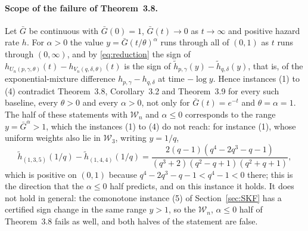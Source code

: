 \documentclass[10pt]{article}
\theoremstyle{plain}
\theoremstyle{definition}
\theoremstyle{remark}
\begin{document}
\paragraph{Scope of the failure of Theorem~3.8.} Let $\bar G$ be continuous with $\bar G(0)=1$, $\bar G(t)\to0$ as $t\to\infty$ and positive hazard rate $h$. For $\alpha>0$ the value $y=\bar G(t/\theta)^\alpha$ runs through all of $(0,1)$ as $t$ runs through $(0,\infty)$, and by \eqref{eq:reduction} the sign of $h_{U_n(p,\gamma,\theta)}(t)-h_{V_n(q,\delta,\theta)}(t)$ is the sign of $\tilde h_{p,\gamma}(y)-\tilde h_{q,\delta}(y)$, that is, of the exponential-mixture difference $h_{p,\gamma}-h_{q,\delta}$ at time $-\log y$. Hence instances (1) to (4) contradict Theorem~3.8, Corollary~3.2 and Theorem~3.9 for every such baseline, every $\theta>0$ and every $\alpha>0$, not only for $\bar G(t)=e^{-t}$ and $\theta=\alpha=1$. The half of these statements with $\mathcal W_n$ and $\alpha\le0$ corresponds to the range $y=\bar G^\alpha>1$, which the instances (1) to (4) do not reach: for instance (1), whose uniform weights also lie in $\mathcal W_3$, writing $y=1/q$,
\[
\tilde h_{(1,3,5)}(1/q)-\tilde h_{(1,4,4)}(1/q)=\frac{2(q-1)(q^4-2q^3-q-1)}{(q^3+2)(q^2-q+1)(q^2+q+1)},
\]
which is positive on $(0,1)$ because $q^4-2q^3-q-1<q^4-1<0$ there; this is the direction that the $\alpha\le 0$ half predicts, and on this instance it holds. It does not hold in general: the comonotone instance (5) of Section~\ref{sec:SKF} has a certified sign change in the same range $y>1$, so the $\mathcal W_n$, $\alpha\le0$ half of Theorem~3.8 fails as well, and both halves of the statement are false.
\end{document}
